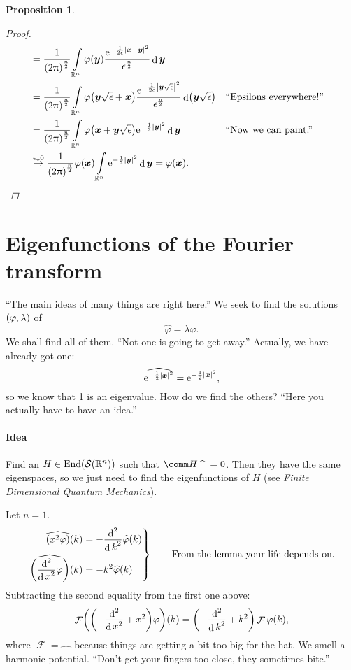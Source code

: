 \documentclass[10pt]{article}
\newtheorem*{proposition}{Proposition}
\DeclarePairedDelimiter\abs{\lvert}{\rvert}
\DeclarePairedDelimiter\of{\lparen}{\rparen}
\newcommand{\R}{\mathbb{R}}
\newcommand{\Rn}{{\R^n}}
\newcommand{\Schwartz}{{\mathcal{S}\of*{\R^n}}}
\DeclareMathOperator{\diffd}{d}
\DeclareMathOperator{\FT}{\mathcal{F}}
\DeclareMathOperator{\End}{End}
\newcommand\gl\lambda
\newcommand\gj\varphi
\renewcommand{\ge}{\epsilon}
\newcommand{\bx}{{\vectorsym x}}
\newcommand{\by}{{\vectorsym y}}
\newcommand\ft\widehat
\newcommand\Int[1]{\int\limits_#1}
\newcommand\nthderiv[3][]{\frac{\diffd^#3 #1}{{\diffd #2}^#3}}
\newcommand\E{\mathrm{e}}
\newcommand{\ftnrm}{\frac{1}{\of*{2\pi}^\frac{n}{2}} }
\begin{document}
\begin{proposition}
\begin{proof}
\begin{align*}
        &=\ftnrm\Int\Rn\gj\of*\by\frac{\E^{-\frac{1}{2\ge}\abs*{\bx-\by}^2}}
        {\ge^\frac{n}{2}}\diffd\by \\
        &=\ftnrm\Int\Rn\gj\of*{\by\sqrt\ge+\bx}\frac{\E^{-\frac{1}{2\ge}\abs*{\by\sqrt\ge}^2}}
        {\ge^\frac{n}{2}}\diffd\of*{\by\sqrt\ge} && \text{``Epsilons everywhere!''}\\    
        &=\ftnrm\Int\Rn\gj\of*{\bx+\by\sqrt\ge}\E^{-\frac{1}{2}\abs*\by^2}\diffd\by
        && \text{``Now we can paint.''}\\
        &\overset{\ge\downarrow 0}{\rightarrow}
        \ftnrm\gj\of*\bx\Int\Rn\E^{-\frac{1}{2}\abs*\by^2}\diffd\by =\gj\of*\bx.
      \end{align*}
    \end{proof}
  \end{proposition}
  
  \section{Eigenfunctions of the Fourier transform}
  ``The main ideas of many things are right here.''
  We seek to find the solutions $\of*{\gj,\gl}$ of
  \begin{equation*}
    \ft\gj=\gl\gj .
  \end{equation*}
  We shall find all of them. ``Not one is going to get away.'' Actually, we have already got one:
  \begin{equation*}
    \ft{\E^{-\frac{1}{2}\abs*\bx^2}}=\E^{-\frac{1}{2}\abs*\bx^2},
  \end{equation*}
  so we know that 1 is an eigenvalue. How do we find the others? ``Here you actually have to have an idea.''
  
  \paragraph{Idea}
  Find an $H\in\End\of*\Schwartz$ such that $\comm H {\ft\quad} = 0$. Then they have the same eigenspaces, so we just need to find the eigenfunctions of $H$ (see \emph{Finite Dimensional Quantum Mechanics}).
  
  Let $n=1$.
  \begin{equation*}
    \left.
    \begin{aligned}
      \ft{\of*{x^2\gj}}\of* k &= -\nthderiv{k}{2}\ft\gj\of* k \\
      \ft{\of*{\nthderiv{x}{2}\gj}}\of* k &= -k^2 \ft\gj\of* k
    \end{aligned}
    \right\rbrace \qquad \text{From the lemma your life depends on.}
  \end{equation*}
  Subtracting the second equality from the first one above:
  \begin{equation*}
    \FT\of*{\of*{-\nthderiv{x}{2}+x^2}\gj}\of* k = \of*{-\nthderiv{k}{2}+k^2}\FT\gj\of* k,
  \end{equation*}
  where $\FT = \ft\quad$ because things are getting a bit too big for the hat.
  We smell a harmonic potential. ``Don't get your fingers too close, they sometimes bite.''
  
\end{document}
